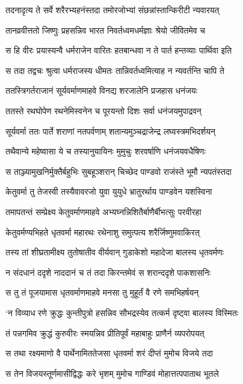 \twolineshloka
{तदनादृत्य ते सर्वे शरैरभ्यहनंस्तदा}
{तमोरजोभ्यां संछन्नांस्तान्किरीटी न्यवारयत्}


\twolineshloka
{तानव्रवीत्ततो जिष्णुः प्रहसन्निव भारत}
{निवर्तध्वमधर्मज्ञाः श्रेयो जीवितमेव च}


\twolineshloka
{स हि वीरः प्रयास्यन्वै धर्मराजेन वारितः}
{हतबान्धवा न ते पार्त हन्तव्याः पार्थिवा इति}


\twolineshloka
{स तदा तद्वचः श्रुत्वा धर्मराजस्य धीमतः}
{तान्निवर्तध्वमित्याह न न्यवर्तन्ति चापि ते}


\twolineshloka
{ततस्त्रिगर्तराजानं सूर्यवर्माणमाहवे}
{विनद्य शरजालेनि प्रजहास धनंजयः}


\twolineshloka
{ततस्ते रथघोपेण रथनेमिस्वनेन च}
{पूरयन्तो दिशः सर्वा धनंजयमुपाद्रवन्}


\twolineshloka
{सूर्यवर्मा ततः पार्ते शराणां नतपर्वणाम्}
{शतान्यमुञ्चद्राजेन्द्र लघ्वस्त्रमभिदर्शयन्}


\twolineshloka
{तथैवान्ये महेष्वासा ये च तस्यानुयायिनः}
{मुमुचुः शरवर्षाणि धनंजयवधैषिणः}


\twolineshloka
{स ताञ्ज्यामुखनिर्मुक्तैर्बहुभिः सुबहूञ्शरान्}
{चिच्छेद पाण्डवो राजंस्ते भूमौ न्यपतंस्तदा}


\twolineshloka
{केतुवर्मा तु तेजस्वी तस्यैवावरजो युवा}
{युयुधे भ्रातुरर्थाय पाण्डवेन यशस्विना}


\twolineshloka
{तमापतन्तं सम्प्रेक्ष्य केतुवर्माणमाहवे}
{अभ्यघ्नन्निशितैर्बाणैर्बीभत्सुः परवीरहा}


\twolineshloka
{केतुवर्मण्यभिहते धृतवर्मा महारथः}
{रथेनाशु समुत्पत्य शरैर्जिष्णुमवाकिरत्}


\twolineshloka
{तस्य तां शीघ्रतामीक्ष्य तुतोषातीव वीर्यवान्}
{गुडाकेशो महादेजा बालस्य धृतवर्मणः}


\twolineshloka
{न संदधानं ददृशे नाददानं च तं तदा}
{किरन्तमेवं स शरान्ददृशे पाकशासनिः}


\twolineshloka
{स तु तं पूजयामास धृतवर्माणमाहवे}
{मनसा तु मुहूर्तं वै रणे समभिहर्षयन्}


\twolineshloka
{`न विव्याध रणे क्रुद्धः कुन्तीपुत्रो हसन्निव}
{सौभद्रस्येव तत्कर्म दृष्ट्वा बालस्य विस्मितः}


\twolineshloka
{तं पन्नगमिव क्रुद्धं कुरुवीरः स्मयन्निव}
{प्रीतिपूर्वं महाबाहुः प्राणैर्न व्यपरोपयत्}


\twolineshloka
{स तथा रक्ष्यमाणो वै पार्थेनामिततेजसा}
{धृतवर्मा शरं दीप्तं मुमोच विजये तदा}


\twolineshloka
{स तेन विजयस्तूर्णमासीद्विद्धः करे भृशम्}
{मुमोच गाण्डिवं मोहात्तत्पपाताथ भूतले}


